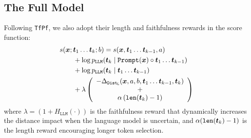 \subsection{The Full Model}
Following \texttt{TfPf}, we also adopt their length and faithfulness rewards in the score function:
\begin{equation}
    \begin{aligned}
         & s({\boldsymbol{x}} ; {\boldsymbol{t}}_1\dots{\boldsymbol{t}}_k; b) = s({\boldsymbol{x}}, {\boldsymbol{t}}_1\dots{\boldsymbol{t}}_{k-1}, a)                    \\
         & \qquad + \log p_{\mathtt{LLM}}({\boldsymbol{t}}_k\mid \mathtt{Prompt}({\boldsymbol{x}}) \circ {\boldsymbol{t}}_1\dots{\boldsymbol{t}}_{k-1})            \\
         & \qquad + \log p_{\mathtt{LLM}}({\boldsymbol{t}}_k\mid {\boldsymbol{t}}_1\dots{\boldsymbol{t}}_{k-1})                                                 \\
         & \qquad + \lambda \left(\begin{array}{c}
                                          - \Delta_{\mathtt{Dist}_{\mathtt{L}}}({\boldsymbol{x}}, a, b, {\boldsymbol{t}}_1\dots{\boldsymbol{t}}_{k-1}, {\boldsymbol{t}}_k) \\
                                          +                                                                                                                    \\
                                          \alpha\left( \mathtt{len}({\boldsymbol{t}}_k)-1 \right)
                                      \end{array}\right)
    \end{aligned}
    \label{eq:final_score}
\end{equation}
where $\lambda = (1 + H_{\mathtt{LLM}}(\cdot))$ is the faithfulness reward that dynamically increases the distance impact when the language model is uncertain, and $\alpha(\mathtt{len}({\boldsymbol{t}}_k)-1)$ is the length reward encouraging longer token selection.
